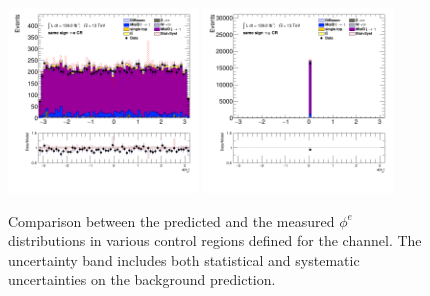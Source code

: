 \begin{figure}[!htp]
\begin{center}
			\includegraphics[width=0.45\textwidth]{chapters/chapter6_HPlus/images/taulep/el_0_phi_SS_TAUEL.png} 
			\includegraphics[width=0.45\textwidth]{chapters/chapter6_HPlus/images/taulep/el_0_phi_SS_TAUMU.png} \\
			\end{center}
			\caption{
			Comparison between the predicted and the measured $\phi^{e}$ distributions in various control regions defined for the \taulep channel. The uncertainty band includes both statistical and systematic uncertainties on the background prediction. 
			}
			\label{fig:bkg-phi-el-taulep}
		\end{figure}

